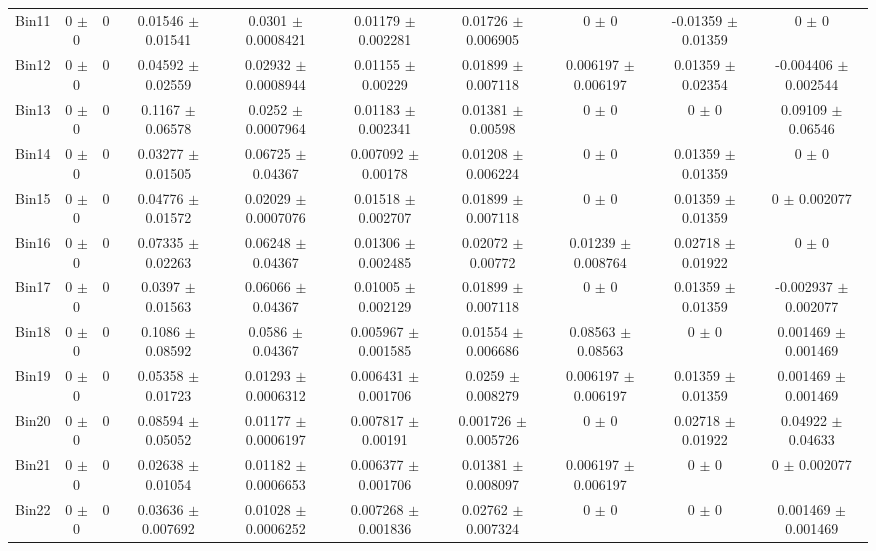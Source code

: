\begin{tabular}{@{\extracolsep{4pt}}lccccccccc@{}}
     Bin11 & 0 $\pm$ 0 & 0 & 0.01546 $\pm$ 0.01541 & 0.0301 $\pm$ 0.0008421 & 0.01179 $\pm$ 0.002281 & 0.01726 $\pm$ 0.006905 & 0 $\pm$ 0 & -0.01359 $\pm$ 0.01359 & 0 $\pm$ 0 \\ 
     Bin12 & 0 $\pm$ 0 & 0 & 0.04592 $\pm$ 0.02559 & 0.02932 $\pm$ 0.0008944 & 0.01155 $\pm$ 0.00229 & 0.01899 $\pm$ 0.007118 & 0.006197 $\pm$ 0.006197 & 0.01359 $\pm$ 0.02354 & -0.004406 $\pm$ 0.002544 \\ 
     Bin13 & 0 $\pm$ 0 & 0 & 0.1167 $\pm$ 0.06578 & 0.0252 $\pm$ 0.0007964 & 0.01183 $\pm$ 0.002341 & 0.01381 $\pm$ 0.00598 & 0 $\pm$ 0 & 0 $\pm$ 0 & 0.09109 $\pm$ 0.06546 \\ 
     Bin14 & 0 $\pm$ 0 & 0 & 0.03277 $\pm$ 0.01505 & 0.06725 $\pm$ 0.04367 & 0.007092 $\pm$ 0.00178 & 0.01208 $\pm$ 0.006224 & 0 $\pm$ 0 & 0.01359 $\pm$ 0.01359 & 0 $\pm$ 0 \\ 
     Bin15 & 0 $\pm$ 0 & 0 & 0.04776 $\pm$ 0.01572 & 0.02029 $\pm$ 0.0007076 & 0.01518 $\pm$ 0.002707 & 0.01899 $\pm$ 0.007118 & 0 $\pm$ 0 & 0.01359 $\pm$ 0.01359 & 0 $\pm$ 0.002077 \\ 
     Bin16 & 0 $\pm$ 0 & 0 & 0.07335 $\pm$ 0.02263 & 0.06248 $\pm$ 0.04367 & 0.01306 $\pm$ 0.002485 & 0.02072 $\pm$ 0.00772 & 0.01239 $\pm$ 0.008764 & 0.02718 $\pm$ 0.01922 & 0 $\pm$ 0 \\ 
     Bin17 & 0 $\pm$ 0 & 0 & 0.0397 $\pm$ 0.01563 & 0.06066 $\pm$ 0.04367 & 0.01005 $\pm$ 0.002129 & 0.01899 $\pm$ 0.007118 & 0 $\pm$ 0 & 0.01359 $\pm$ 0.01359 & -0.002937 $\pm$ 0.002077 \\ 
     Bin18 & 0 $\pm$ 0 & 0 & 0.1086 $\pm$ 0.08592 & 0.0586 $\pm$ 0.04367 & 0.005967 $\pm$ 0.001585 & 0.01554 $\pm$ 0.006686 & 0.08563 $\pm$ 0.08563 & 0 $\pm$ 0 & 0.001469 $\pm$ 0.001469 \\ 
     Bin19 & 0 $\pm$ 0 & 0 & 0.05358 $\pm$ 0.01723 & 0.01293 $\pm$ 0.0006312 & 0.006431 $\pm$ 0.001706 & 0.0259 $\pm$ 0.008279 & 0.006197 $\pm$ 0.006197 & 0.01359 $\pm$ 0.01359 & 0.001469 $\pm$ 0.001469 \\ 
     Bin20 & 0 $\pm$ 0 & 0 & 0.08594 $\pm$ 0.05052 & 0.01177 $\pm$ 0.0006197 & 0.007817 $\pm$ 0.00191 & 0.001726 $\pm$ 0.005726 & 0 $\pm$ 0 & 0.02718 $\pm$ 0.01922 & 0.04922 $\pm$ 0.04633 \\ 
     Bin21 & 0 $\pm$ 0 & 0 & 0.02638 $\pm$ 0.01054 & 0.01182 $\pm$ 0.0006653 & 0.006377 $\pm$ 0.001706 & 0.01381 $\pm$ 0.008097 & 0.006197 $\pm$ 0.006197 & 0 $\pm$ 0 & 0 $\pm$ 0.002077 \\ 
     Bin22 & 0 $\pm$ 0 & 0 & 0.03636 $\pm$ 0.007692 & 0.01028 $\pm$ 0.0006252 & 0.007268 $\pm$ 0.001836 & 0.02762 $\pm$ 0.007324 & 0 $\pm$ 0 & 0 $\pm$ 0 & 0.001469 $\pm$ 0.001469 \\ 

\end{tabular}
